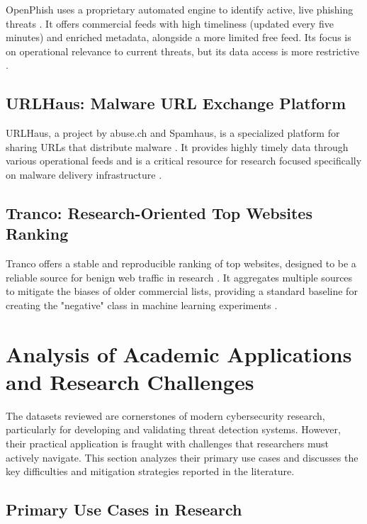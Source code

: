 \documentclass[journal,article,submit,pdftex,moreauthors]{Definitions/mdpi}
\begin{document}
OpenPhish uses a proprietary automated engine to identify active, live phishing threats \citep{ref-2,ref-7}. It offers commercial feeds with high timeliness (updated every five minutes) and enriched metadata, alongside a more limited free feed. Its focus is on operational relevance to current threats, but its data access is more restrictive \citep{ref-8}.

\subsection{URLHaus: Malware URL Exchange Platform}

URLHaus, a project by abuse.ch and Spamhaus, is a specialized platform for sharing URLs that distribute malware \citep{ref-3,ref-9}. It provides highly timely data through various operational feeds and is a critical resource for research focused specifically on malware delivery infrastructure \citep{ref-10}.

\subsection{Tranco: Research-Oriented Top Websites Ranking}

Tranco offers a stable and reproducible ranking of top websites, designed to be a reliable source for benign web traffic in research \citep{ref-11}. It aggregates multiple sources to mitigate the biases of older commercial lists, providing a standard baseline for creating the "negative" class in machine learning experiments \citep{ref-4,ref-12}.

\section{Analysis of Academic Applications and Research Challenges}

The datasets reviewed are cornerstones of modern cybersecurity research, particularly for developing and validating threat detection systems. However, their practical application is fraught with challenges that researchers must actively navigate. This section analyzes their primary use cases and discusses the key difficulties and mitigation strategies reported in the literature.

\subsection{Primary Use Cases in Research}
\end{document}
